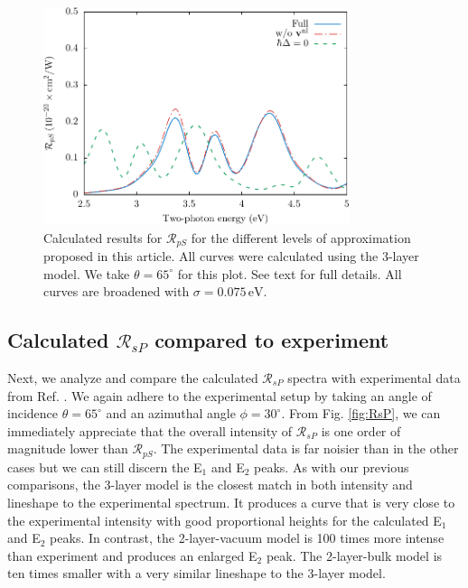 \documentclass[11pt]{book}
\begin{document}
\begin{figure}
\centering
\includegraphics[width=0.8\textwidth]{../figures/04-results/fig-4_4_03}
\caption{Calculated results for $\mathcal{R}_{pS}$ for the
different levels of approximation proposed in this article. All curves were
calculated using the 3-layer model. We take $\theta=65^{\circ}$ for this plot.
See text for full details. All curves are broadened with
$\sigma=0.075\,\text{eV}$.
\label{fig:improvements}}
\end{figure}


\subsection{Calculated \texorpdfstring{$\mathcal{R}_{sP}$}{RsP} compared to
experiment}\label{sec:RsP}

Next, we analyze and compare the calculated $\mathcal{R}_{sP}$ spectra with
experimental data from Ref. \cite{mejiaPRB02}. We again adhere to the
experimental setup by taking an angle of incidence $\theta=65^{\circ}$ and an
azimuthal angle $\phi=30^\circ$. From Fig. \ref{fig:RsP}, we can immediately
appreciate that the overall intensity of $\mathcal{R}_{sP}$ is one order of
magnitude lower than $\mathcal{R}_{pS}$. The experimental data is far noisier
than in the other cases but we can still discern the E$_{1}$ and E$_{2}$ peaks.
As with our previous comparisons, the 3-layer model is the closest match in both
intensity and lineshape to the experimental spectrum. It produces a curve that
is very close to the experimental intensity with good proportional heights for
the calculated E$_{1}$ and E$_{2}$ peaks. In contrast, the 2-layer-vacuum model
is 100 times more intense than experiment and produces an enlarged E$_{2}$ peak.
The 2-layer-bulk model is ten times smaller with a very similar lineshape to the
3-layer model.
\end{document}
